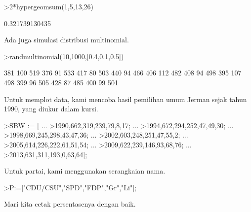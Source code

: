 \documentclass{article}
\begin{document}
\begin{eulernotebook}
\begin{eulerprompt}
>2*hypergeomsum(1,5,13,26)
\end{eulerprompt}
\begin{euleroutput}
  0.321739130435
\end{euleroutput}
\begin{eulercomment}
Ada juga simulasi distribusi multinomial.
\end{eulercomment}
\begin{eulerprompt}
>randmultinomial(10,1000,[0.4,0.1,0.5])
\end{eulerprompt}
\begin{euleroutput}
            381           100           519 
            376            91           533 
            417            80           503 
            440            94           466 
            406           112           482 
            408            94           498 
            395           107           498 
            399            96           505 
            428            87           485 
            400            99           501 
\end{euleroutput}
\begin{eulercomment}
Untuk memplot data, kami mencoba hasil pemilihan umum Jerman sejak
tahun 1990, yang diukur dalam kursi.
\end{eulercomment}
\begin{eulerprompt}
>SBW := [ ...
>1990,662,319,239,79,8,17; ...
>1994,672,294,252,47,49,30; ...
>1998,669,245,298,43,47,36; ...
>2002,603,248,251,47,55,2; ...
>2005,614,226,222,61,51,54; ...
>2009,622,239,146,93,68,76; ...
>2013,631,311,193,0,63,64];
\end{eulerprompt}
\begin{eulercomment}
Untuk partai, kami menggunakan serangkaian nama.
\end{eulercomment}
\begin{eulerprompt}
>P:=["CDU/CSU","SPD","FDP","Gr","Li"];
\end{eulerprompt}
\begin{eulercomment}
Mari kita cetak persentasenya dengan baik.


\end{eulercomment}
\end{eulernotebook}
\end{document}

